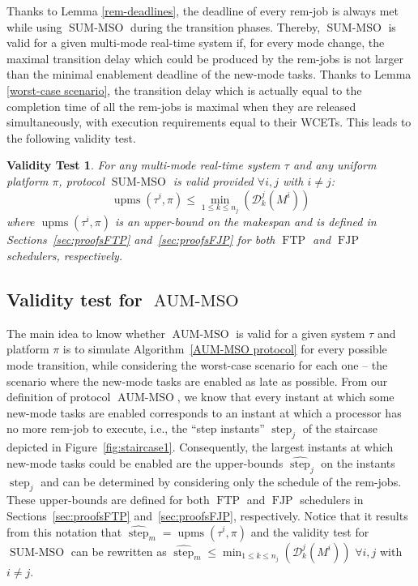 \documentclass[10pt,english,a4paper]{article}
\newtheorem{validity test}{Validity Test}
\newcommand{\upms}{\operatorname{upms}}
\newcommand{\FTP}{\operatorname{FTP}}
\newcommand{\FJP}{\operatorname{FJP}}
\newcommand{\step}{\widehat{\operatorname{step}}}
\newcommand{\minstep}{\operatorname{step}}
\newcommand{\SUMMSO}{\operatorname{SUM-MSO}}
\newcommand{\AUMMSO}{\operatorname{AUM-MSO}}
\begin{document}
Thanks to Lemma \ref{rem-deadlines}, the deadline of every rem-job is always met while using $\SUMMSO$ during the transition phases. Thereby, $\SUMMSO$ is valid for a given multi-mode real-time system if, for every mode change, the maximal transition delay which could be produced by the rem-jobs is not larger than the minimal enablement deadline of the new-mode tasks. Thanks to Lemma \ref{worst-case scenario}, the transition delay which is actually equal to the completion time of all the rem-jobs is maximal when they are released simultaneously, with execution requirements equal to their WCETs. This leads to the following validity test.

\begin{validity test}
For any multi-mode real-time system $\tau$ and any uniform platform $\pi$, protocol $\SUMMSO$ is valid provided $\forall i,j$ with $i \neq j$:
\[ \upms(\tau^i, \pi) \le \min_{1 \le k \le n_j} \left(\mathcal{D}_k^j(M^i)\right) \]
\noindent where $\upms(\tau^i, \pi)$ is an upper-bound on the makespan and is defined in Sections~\ref{sec:proofsFTP} and~\ref{sec:proofsFJP} for both $\FTP$ and $\FJP$ schedulers, respectively. 
\end{validity test}

\subsection{Validity test for $\AUMMSO$}

The main idea to know whether $\AUMMSO$ is valid for a given system $\tau$ and platform $\pi$ is to simulate Algorithm~\ref{AUM-MSO protocol} for every possible mode transition, while considering the worst-case scenario for each one -- the scenario where the new-mode tasks are enabled as late as possible. From our definition of protocol $\AUMMSO$, we know that every instant at which some new-mode tasks are enabled corresponds to an instant at which a processor has no more rem-job to execute, i.e., the ``step instants'' $\minstep_j$ of the staircase depicted in Figure~\ref{fig:staircase1}. Consequently, the largest instants at which new-mode tasks could be enabled are the upper-bounds $\step_j$ on the instants $\minstep_j$ and can be determined by considering only the schedule of the rem-jobs. These upper-bounds are defined for both $\FTP$ and $\FJP$ schedulers in Sections~\ref{sec:proofsFTP} and~\ref{sec:proofsFJP}, respectively. Notice that it results from this notation that $\step_m = \upms(\tau^i, \pi)$ and the validity test for $\SUMMSO$ can be rewritten as $\step_m \le \min_{1 \le k \le n_j} (\mathcal{D}_k^j(M^i))$ $\forall i,j$ with $i \neq j$. 
\end{document}
